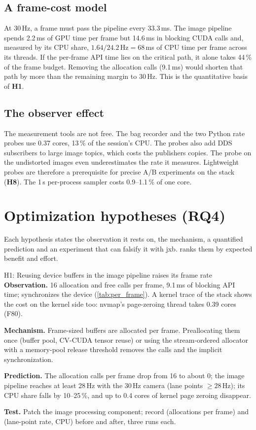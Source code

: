 \documentclass[11pt,a4paper]{article}
\newcommand{\jxb}{\textsf{jxb}}
\newcommand{\finding}[1]{\textsf{\small F#1}}
\newcommand{\hyp}[1]{\textbf{H#1}}
\begin{document}
\subsection{A frame-cost model}
At 30\,Hz, a frame must pass the pipeline every 33.3\,ms. The image pipeline spends 2.2\,ms of GPU time per frame but
14.6\,ms in blocking CUDA calls and, measured by its CPU share, $1.64 / 24.2\,\mathrm{Hz} = 68$\,ms of CPU time per
frame across its threads. If the per-frame API time lies on the critical path, it alone takes 44\,\% of the frame
budget. Removing the allocation calls (9.1\,ms) would shorten that path by more than the remaining margin to 30\,Hz.
This is the quantitative basis of \hyp{1}.

\subsection{The observer effect}
The measurement tools are not free. The bag recorder and the two Python rate probes use 0.37 cores, 13\,\% of the
session's CPU. The probes also add DDS subscribers to large image topics, which costs the publishers copies. The probe
on the undistorted images even underestimates the rate it measures. Lightweight probes are therefore a prerequisite
for precise A/B experiments on the stack (\hyp{8}). The 1\,s per-process sampler costs 0.9--1.1\,\% of one core.

\section{Optimization hypotheses (RQ4)}\label{sec:hypotheses}
Each hypothesis states the observation it rests on, the mechanism, a quantified prediction and an experiment that can
falsify it with \jxb{}.  ranks them by expected benefit and effort.

\begin{hypbox}{H1: Reusing device buffers in the image pipeline raises its frame rate}
\textbf{Observation.} 16 allocation and free calls per frame, 9.1\,ms of blocking API time; 
synchronizes the device (\cref{tab:per_frame}). A kernel trace of the stack shows the cost on the kernel side too:
nvmap's page-zeroing thread  takes 0.39 cores (\finding{80}).
\par\textbf{Mechanism.} Frame-sized buffers are allocated per frame. Preallocating them once (buffer pool, CV-CUDA tensor
reuse) or using the stream-ordered allocator with a memory-pool release threshold removes the calls and the implicit
synchronization.
\par\textbf{Prediction.} The allocation calls per frame drop from 16 to about 0; the image pipeline reaches at least
28\,Hz with the 30\,Hz camera (lane points $\ge 28$\,Hz); its CPU share falls by 10--25\,\%, and up to 0.4 cores of
kernel page zeroing disappear.
\par\textbf{Test.} Patch the image processing component; record  (allocations per frame) and
 (lane-point rate, CPU) before and after, three runs each.
\end{hypbox}
\end{document}
